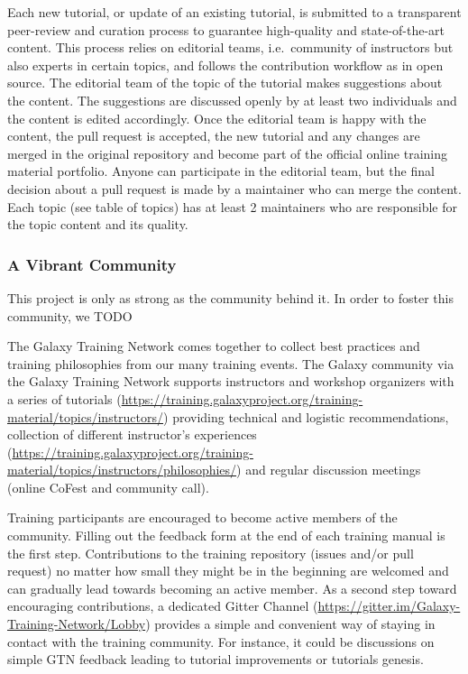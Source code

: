 \documentclass[10pt,letterpaper]{article}
\begin{document}
Each new tutorial, or update of an existing tutorial, is submitted to a transparent peer-review and curation process to guarantee high-quality and state-of-the-art content.
This process relies on editorial teams, i.e.\ community of instructors but also experts in certain topics, and follows the contribution workflow as in open source.
The editorial team of the topic of the tutorial makes suggestions about the content.
The suggestions are discussed openly by at least two individuals and the content is edited accordingly.
Once the editorial team is happy with the content, the pull request is accepted, the new tutorial and any changes are merged in the original repository and become part of the official online training material portfolio.
Anyone can participate in the editorial team, but the final decision about a pull request is made by a maintainer who can merge the content.
Each topic (see table of topics) has at least 2 maintainers who are responsible for the topic content and its quality.

\subsubsection*{A Vibrant Community}
This project is only as strong as the community behind it. In order to foster this community, we TODO

The Galaxy Training Network comes together to collect best practices and training philosophies from our many training events.
The Galaxy community via the Galaxy Training Network supports instructors and workshop organizers with a series of tutorials (\url{https://training.galaxyproject.org/training-material/topics/instructors/}) providing technical and logistic recommendations, collection of different instructor’s experiences (\url{https://training.galaxyproject.org/training-material/topics/instructors/philosophies/}) and regular discussion meetings (online CoFest and community call).

Training participants are encouraged to become active members of the community.
Filling out the feedback form at the end of each training manual is the first step. Contributions to the training repository (issues and/or pull request) no matter how small they might be in the beginning are welcomed and can gradually lead towards becoming an active member.
As a second step toward encouraging contributions, a dedicated Gitter Channel (\url{https://gitter.im/Galaxy-Training-Network/Lobby}) provides a simple and convenient way of staying in contact with the training community.
For instance, it could be discussions on simple GTN feedback leading to tutorial improvements or tutorials genesis.
\end{document}
